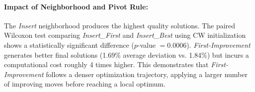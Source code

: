 \documentclass[11pt, a4paper]{article}
\begin{document}
\paragraph{Impact of Neighborhood and Pivot Rule:} 
The \textit{Insert} neighborhood produces the highest quality solutions. The paired Wilcoxon test comparing \textit{Insert\_First} and \textit{Insert\_Best} using CW initialization shows a statistically significant difference ($p$-value $= 0.0006$). \textit{First-Improvement} generates better final solutions (1.69\% average deviation vs. 1.84\%) but incurs a computational cost roughly 4 times higher. This demonstrates that \textit{First-Improvement} follows a denser optimization trajectory, applying a larger number of improving moves before reaching a local optimum.
\end{document}
